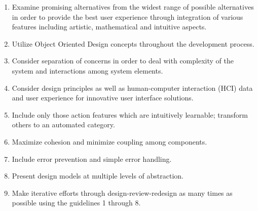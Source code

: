 \documentclass{article}
\begin{document}
\begin{enumerate}
  \item Examine promising alternatives from the widest range of possible alternatives in order to provide the best user experience through integration of various features including artistic, mathematical and intuitive aspects.
  \item Utilize Object Oriented Design concepts throughout the development process.  
  \item Consider separation of concerns in order to deal with complexity of the system and interactions among system elements.
  \item Consider design principles as well as human-computer interaction (HCI) data and user experience for innovative user interface solutions. 
  \item Include only those action features which are intuitively learnable; transform others to an automated category.
  \item Maximize cohesion and minimize coupling among components.
  \item Include error prevention and simple error handling.
  \item Present design models at multiple levels of abstraction. 
  \item Make iterative efforts through design-review-redesign as many times as possible using the guidelines 1 through 8.
\end{enumerate}
\end{document}

